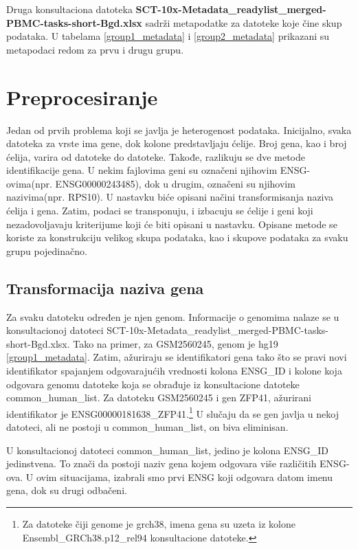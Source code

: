\documentclass[a4paper]{article}
\begin{document}
Druga konsultaciona datoteka \textbf{SCT-10x-Metadata\_readylist\_merged-PBMC-tasks-short-Bgd.xlsx} sadrži metapodatke za datoteke koje čine skup podataka. U tabelama \ref{group1_metadata} i \ref{group2_metadata} prikazani su metapodaci redom za prvu i drugu grupu.

\section{Preprocesiranje}

Jedan od prvih problema koji se javlja je heterogenost podataka. Inicijalno, svaka datoteka za vrste ima gene, dok kolone predstavljaju ćelije. Broj gena, kao i broj ćelija, varira od datoteke do datoteke. Takođe, razlikuju se dve metode identifikacije gena. U nekim fajlovima geni su označeni njihovim ENSG-ovima(npr. ENSG00000243485), dok u drugim, označeni su njihovim nazivima(npr. RPS10). U nastavku biće opisani načini transformisanja  naziva ćelija i gena. Zatim, podaci se transponuju, i izbacuju se ćelije i geni koji nezadovoljavaju kriterijume koji će biti opisani u nastavku. Opisane metode se koriste za konstrukciju velikog skupa podataka, kao i skupove podataka za svaku grupu pojedinačno.

\subsection{Transformacija naziva gena}

Za svaku datoteku određen je njen genom. Informacije o genomima nalaze se u konsultacionoj datoteci SCT-10x-Metadata\_readylist\_merged-PBMC-tasks-short-Bgd.xlsx. Tako na primer, za GSM2560245, genom je hg19 \ref{group1_metadata}. Zatim, ažuriraju se identifikatori gena tako što se pravi novi identifikator spajanjem odgovarajućih vrednosti kolona ENSG\_ID i kolone koja odgovara genomu datoteke koja se obrađuje iz konsultacione datoteke common\_human\_list. Za datoteku GSM2560245 i gen ZFP41, ažurirani identifikator je ENSG00000181638\_ZFP41.\footnote{Za datoteke čiji genome je grch38, imena gena su uzeta iz kolone Ensembl\_GRCh38.p12\_rel94 konsultacione datoteke.} U slučaju da se gen javlja u nekoj datoteci, ali ne postoji u common\_human\_list, on biva eliminisan. 

U konsultacionoj datoteci common\_human\_list, jedino je kolona ENSG\_ID jedinstvena. To znači da postoji naziv gena kojem odgovara više različitih ENSG-ova. U ovim situacijama, izabrali smo prvi ENSG koji odgovara datom imenu gena, dok su drugi odbačeni.
\end{document}
